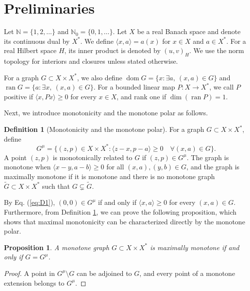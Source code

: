 \documentclass[11pt]{article}
\newcommand{\N}{\mathbb N}
\newcommand{\dom}{\operatorname{dom}}
\newcommand{\pair}[2]{\langle #1,#2\rangle}
\newtheorem{proposition}{Proposition}
\theoremstyle{definition}
\newtheorem{definition}{Definition}
\theoremstyle{remark}
\begin{document}
\section{Preliminaries}
\label{sec:definitions}
Let $\N=\{1,2,\ldots\}$ and $\N_0=\{0,1,\ldots\}$. Let $X$ be a real Banach space and denote its continuous dual by $X^*$. We define $\pair{x}{a}=a(x)$ for $x\in X$ and $a\in X^*$. For a real Hilbert space $H$, its inner product is denoted by $(u,v)_H$. We use the norm topology for interiors and closures unless stated otherwise.

For a graph $G\subset X\times X^*$, we also define $\dom G=\{x:\exists a,\ (x,a)\in G\}$ and $\operatorname{ran}G=\{a:\exists x,\ (x,a)\in G\}$. 
For a bounded linear map $P:X\to X^*$, we call $P$ positive if $\pair{x}{Px}\ge0$ for every $x\in X$, and rank one if $\dim(\operatorname{ran}P)=1$. 

Next, we introduce monotonicity and the monotone polar  \cite{martinezsvaiter2005,bauschkemclarensendov2006} as follows. 

\begin{definition}[Monotonicity and the monotone polar]
\label{D1}
For a graph $G\subset X\times X^*$, define
\begin{equation}
G^\mu=\{(z,p)\in X\times X^*:
 \pair{z-x}{p-a}\ge0\quad\forall(x,a)\in G\}.
\label{eq:D1}
\end{equation}
A point $(z,p)$ is monotonically related to $G$ if $(z,p)\in G^\mu$.
The graph is monotone when $\pair{x-y}{a-b}\ge0$ for all $(x,a),(y,b)\in G$, and the graph is maximally monotone if it is monotone and there is no monotone graph $\widetilde G\subset X\times X^*$ such that $G\subsetneq\widetilde G$. 
\end{definition}

By Eq. (\ref{eq:D1}), $(0,0)\in G^\mu$ if and only if $\pair{x}{a}\ge0$ for every $(x,a)\in G$. Furthermore, from Definition \ref{D1}, we can prove the following proposition, which shows that maximal monotonicity can be characterized directly by the monotone polar. 


\begin{proposition}
A monotone graph $G\subset X\times X^*$ is maximally monotone if and only if $G=G^\mu$.
\end{proposition}
\begin{proof}
A point in $G^\mu\setminus G$ can be adjoined to $G$, and every point of a monotone extension belongs to $G^\mu$.
\end{proof}
\end{document}
